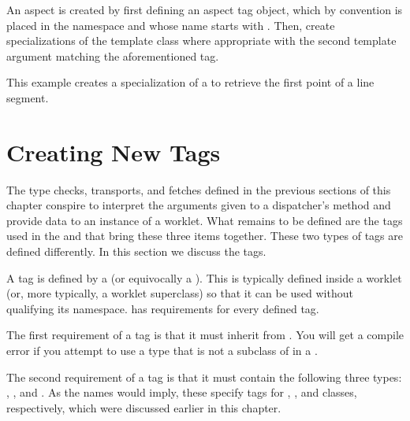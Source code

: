 An aspect is created by first defining an aspect tag object, which by convention is placed in the \vtkmexecarg{} namespace and whose name starts with .
Then, create specializations of the  template class where appropriate with the second template argument matching the aforementioned tag.

This example creates a specialization of a  to retrieve the first point of a line segment.




\section{Creating New \protect\controlsignature Tags}
\label{sec:NewControlSignatureTags}


The type checks, transports, and fetches defined in the previous sections of this chapter conspire to interpret the arguments given to a dispatcher's  method and provide data to an instance of a worklet.
What remains to be defined are the tags used in the \controlsignature and \executionsignature that bring these three items together.
These two types of tags are defined differently.
In this section we discuss the \controlsignature tags.

A \controlsignature tag is defined by a  (or equivocally a ).
This  is typically defined inside a worklet (or, more typically, a worklet superclass) so that it can be used without qualifying its namespace.
\VTKm has requirements for every defined \controlsignature tag.

The first requirement of a \controlsignature tag is that it must inherit from .
You will get a compile error if you attempt to use a type that is not a subclass of  in a \controlsignature.

The second requirement of a \controlsignature tag is that it must contain the following three types: , , and .
As the names would imply, these specify tags for , , and  classes, respectively, which were discussed earlier in this chapter.

